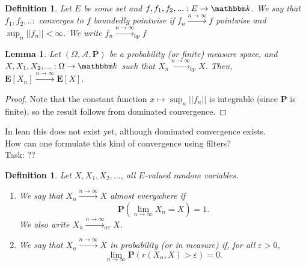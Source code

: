 \documentclass{article}
\newtheorem{lemma}[proposition]{Lemma}
\newtheorem{definition}[proposition]{Definition}
\theoremstyle{definition}
\theoremstyle{step} \newtheorem{step}{Step}
\begin{document}
\begin{paracol}{2}
  \phantom{1}
  \begin{definition}
    Let $E$ be some set and $f, f_1, f_2,...: E \to \mathbbm k$. We say
    that $f_1,f_2,..:$ converges to $f$ boundedly pointwise if $f_n
      \xrightarrow{n\to\infty} f$ pointwise and $\sup_n ||f_n|| <
      \infty$. We write $f_n \xrightarrow{n\to\infty}_{bp} f$
  \end{definition}

  \begin{lemma}\label{lemma:bp}
    Let $(\Omega, \mathcal A, \mathbf P)$ be a probability (or finite)
    measure space, and $X, X_1, X_2,... : \Omega \to \mathbbm k$ such
    that $X_n \xrightarrow{n\to\infty}_{bp} X$. Then, $\mathbf E[X_n]
      \xrightarrow{n\to\infty} \mathbf E[X]$.
  \end{lemma}

  \begin{proof}
    \sloppy Note that the constant function $x \mapsto \sup_n ||f_n||$
    is integrable (since $\mathbf P$ is finite), so the result follows
    from dominated convergence.
  \end{proof}
  \switchcolumn
  \phantom{1}

  In lean this does not exist yet, although dominated
  convergence exists.\\ How can one formulate this kind of convergence
  using filters? \\ Task: ??


  \begin{definition}
    Let $X,X_1,X_2,...$, all $E$-valued random variables.
    \begin{enumerate}
      \item We say that $X_n \xrightarrow{n\to\infty} X$ almost everywhere if
            $$\mathbf P(\lim_{n\to\infty} X_n = X) = 1.$$
            We also write $X_n\xrightarrow{n\to\infty}_{ae} X$.
      \item We say that $X_n \xrightarrow{n\to\infty} X$ in probability
            (or in measure) if, for all $\varepsilon>0$,
            $$ \lim_{n\to\infty} \mathbf P(r(X_n, X) > \varepsilon) = 0.$$
    \end{enumerate}
  \end{definition}


\end{paracol}
\end{document}
